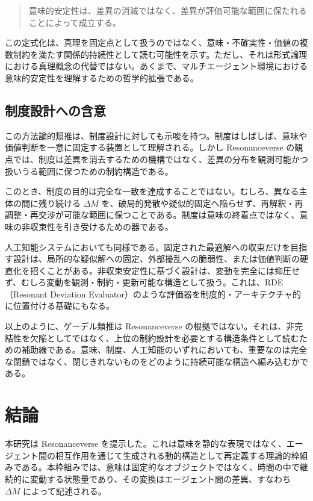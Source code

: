 \documentclass[11pt,a4paper]{article}
\theoremstyle{definition}
\begin{document}
\begin{quote}
意味的安定性は、差異の消滅ではなく、差異が評価可能な範囲に保たれることによって成立する。
\end{quote}

この定式化は、真理を固定点として扱うのではなく、意味・不確実性・価値の複数制約を満たす関係的持続性として読む可能性を示す。ただし、それは形式論理における真理概念の代替ではない。あくまで、マルチエージェント環境における意味的安定性を理解するための哲学的拡張である。

\subsection{制度設計への含意}

この方法論的類推は、制度設計に対しても示唆を持つ。制度はしばしば、意味や価値判断を一意に固定する装置として理解される。しかし Resonanceverse の観点では、制度は差異を消去するための機構ではなく、差異の分布を観測可能かつ扱いうる範囲に保つための制約構造である。

このとき、制度の目的は完全な一致を達成することではない。むしろ、異なる主体の間に残り続ける $\Delta M$ を、破局的発散や疑似的固定へ陥らせず、再解釈・再調整・再交渉が可能な範囲に保つことである。制度は意味の終着点ではなく、意味の非収束性を引き受けるための器である。

人工知能システムにおいても同様である。固定された最適解への収束だけを目指す設計は、局所的な疑似解への固定、外部擾乱への脆弱性、または価値判断の硬直化を招くことがある。非収束安定性に基づく設計は、変動を完全には抑圧せず、むしろ変動を観測・制約・更新可能な構造として扱う。これは、RDE（Resonant Deviation Evaluator）のような評価器を制度的・アーキテクチャ的に位置付ける基礎にもなる。

以上のように、ゲーデル類推は Resonanceverse の根拠ではない。それは、非完結性を欠陥としてではなく、上位の制約設計を必要とする構造条件として読むための補助線である。意味、制度、人工知能のいずれにおいても、重要なのは完全な閉鎖ではなく、閉じきれないものをどのように持続可能な構造へ編み込むかである。



\section{結論}

本研究は Resonanceverse を提示した。これは意味を静的な表現ではなく、エージェント間の相互作用を通じて生成される動的構造として再定義する理論的枠組みである。本枠組みでは、意味は固定的なオブジェクトではなく、時間の中で継続的に変動する状態量であり、その変換はエージェント間の差異、すなわち $\Delta M$ によって記述される。
\end{document}
